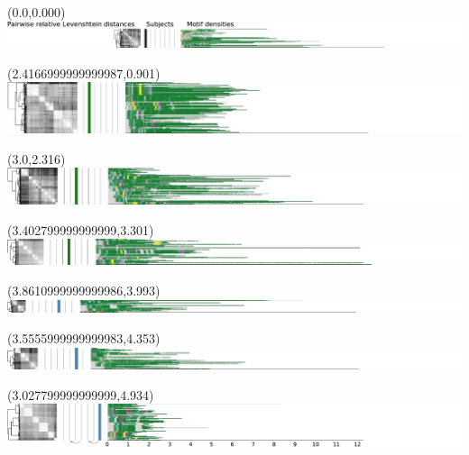 \documentclass{article}
\begin{document}
\begin{textblock}{13}(0.0,0.000)\includegraphics{latex/figures/haplotypes-constrained/5qtel_1-500K_1_12_12_rc-HG001.pdf}\end{textblock}
\begin{textblock}{13}(2.4166999999999987,0.901)\includegraphics{latex/figures/haplotypes-constrained/5qtel_1-500K_1_12_12_rc-HG002.pdf}\end{textblock}
\begin{textblock}{13}(3.0,2.316)\includegraphics{latex/figures/haplotypes-constrained/5qtel_1-500K_1_12_12_rc-HG003.pdf}\end{textblock}
\begin{textblock}{13}(3.402799999999999,3.301)\includegraphics{latex/figures/haplotypes-constrained/5qtel_1-500K_1_12_12_rc-HG004.pdf}\end{textblock}
\begin{textblock}{13}(3.8610999999999986,3.993)\includegraphics{latex/figures/haplotypes-constrained/5qtel_1-500K_1_12_12_rc-HG005.pdf}\end{textblock}
\begin{textblock}{13}(3.5555999999999983,4.353)\includegraphics{latex/figures/haplotypes-constrained/5qtel_1-500K_1_12_12_rc-HG006.pdf}\end{textblock}
\begin{textblock}{13}(3.027799999999999,4.934)\includegraphics{latex/figures/haplotypes-constrained/5qtel_1-500K_1_12_12_rc-HG007.pdf}\end{textblock}
\end{document}
